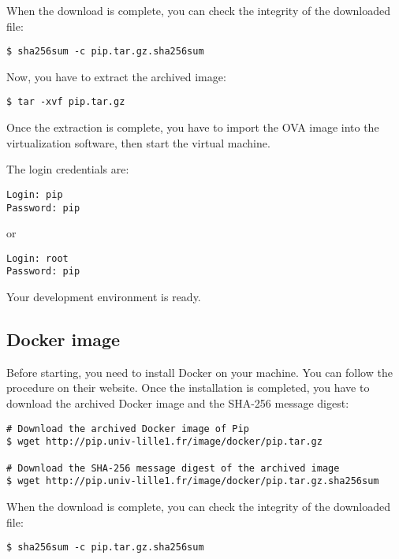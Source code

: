 \documentclass[10pt,a4paper,titlepage]{refart}
\begin{document}
When the download is complete, you can check the integrity of the downloaded
file:

\begin{lstlisting}[style=BashStyle]
$ sha256sum -c pip.tar.gz.sha256sum
\end{lstlisting}

Now, you have to extract the archived image:

\begin{lstlisting}[style=BashStyle]
$ tar -xvf pip.tar.gz
\end{lstlisting}

Once the extraction is complete, you have to import the OVA image into the
virtualization software, then start the virtual machine.

The login credentials are:

\begin{lstlisting}
Login: pip
Password: pip
\end{lstlisting}

or

\begin{lstlisting}
Login: root
Password: pip
\end{lstlisting}

Your development environment is ready.

\subsection{Docker image}

Before starting, you need to install Docker on your machine. You can follow the
procedure on their website. Once the installation is completed, you have to
download the archived Docker image and the SHA-256 message digest:

\begin{lstlisting}[style=BashStyle]
# Download the archived Docker image of Pip
$ wget http://pip.univ-lille1.fr/image/docker/pip.tar.gz

# Download the SHA-256 message digest of the archived image
$ wget http://pip.univ-lille1.fr/image/docker/pip.tar.gz.sha256sum
\end{lstlisting}

When the download is complete, you can check the integrity of the downloaded
file:

\begin{lstlisting}[style=BashStyle]
$ sha256sum -c pip.tar.gz.sha256sum
\end{lstlisting}
\end{document}
